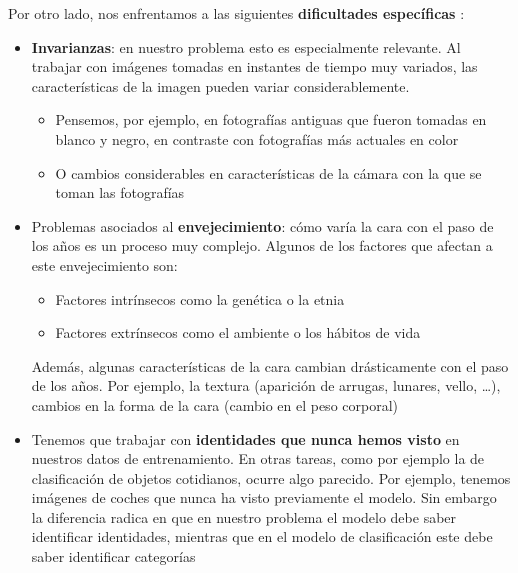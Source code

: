 Por otro lado, nos enfrentamos a las siguientes \textbf{dificultades específicas} \cite{informatica:challenges_retrieval}:

\begin{itemize}
	\item \textbf{Invarianzas}: en nuestro problema esto es especialmente relevante. Al trabajar con imágenes tomadas en instantes de tiempo muy variados, las características de la imagen pueden variar considerablemente.
	      \begin{itemize}
		      \item Pensemos, por ejemplo, en fotografías antiguas que fueron tomadas en blanco y negro, en contraste con fotografías más actuales en color
		      \item O cambios considerables en características de la cámara con la que se toman las fotografías
	      \end{itemize}
	\item Problemas asociados al \textbf{envejecimiento}: cómo varía la cara con el paso de los años es un proceso muy complejo. Algunos de los factores que afectan a este envejecimiento \cite{informatica:tecnica_sintesis_aifr} son:
	      \begin{itemize}
		      \item Factores intrínsecos como la genética o la etnia
		      \item Factores extrínsecos como el ambiente o los hábitos de vida
	      \end{itemize}
	      Además, algunas características de la cara cambian drásticamente con el paso de los años. Por ejemplo, la textura (aparición de arrugas, lunares, vello, \ldots), cambios en la forma de la cara (cambio en el peso corporal)

	\item Tenemos que trabajar con \textbf{identidades que nunca hemos visto} en nuestros datos de entrenamiento. En otras tareas, como por ejemplo la de clasificación de objetos cotidianos, ocurre algo parecido. Por ejemplo, tenemos imágenes de coches que nunca ha visto previamente el modelo. Sin embargo la diferencia radica en que en nuestro problema el modelo debe saber identificar identidades, mientras que en el modelo de clasificación este debe saber identificar categorías


\end{itemize}
